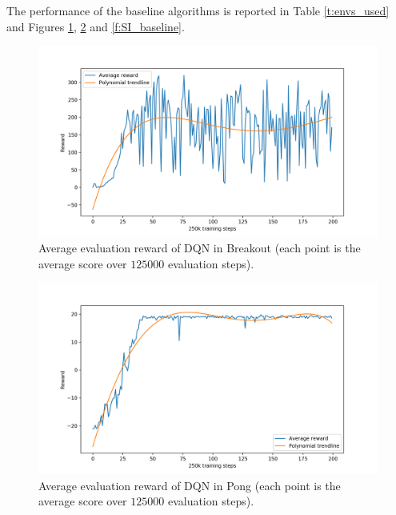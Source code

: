The performance of the baseline algorithms is reported in Table \ref{t:envs_used} 
and Figures \ref{f:BO_baseline}, \ref{f:P_baseline} and \ref{f:SI_baseline}.
%
\begin{figure}
    \includegraphics[width=\textwidth]{pictures/experiments/baseline_breakout}
    \centering
    \caption[Average performance of DQN in Breakout]{Average evaluation reward 
	    of DQN in Breakout (each point is the average score over $125000$
	    evaluation steps).}
    \label{f:BO_baseline}
\end{figure}
%
%
\begin{figure}
    \includegraphics[width=\textwidth]{pictures/experiments/baseline_pong}
    \centering
    \caption[Average performance of DQN in Pong]{Average evaluation reward 
	    of DQN in Pong (each point is the average score over $125000$
	    evaluation steps).}
    \label{f:P_baseline}
\end{figure}
%
%
